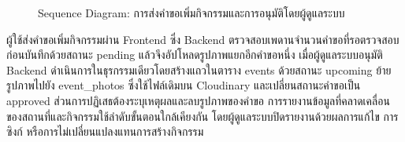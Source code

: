 \begin{figure}[H]
\centering
{}
\caption{Sequence Diagram: การส่งคำขอเพิ่มกิจกรรมและการอนุมัติโดยผู้ดูแลระบบ}
\label{fig:sequence_event_request}
\end{figure}

ผู้ใช้ส่งคำขอเพิ่มกิจกรรมผ่าน Frontend ซึ่ง Backend ตรวจสอบเพดานจำนวนคำขอที่รอตรวจสอบก่อนบันทึกด้วยสถานะ pending แล้วจึงอัปโหลดรูปภาพแยกอีกคำขอหนึ่ง เมื่อผู้ดูแลระบบอนุมัติ Backend ดำเนินการในธุรกรรมเดียวโดยสร้างแถวในตาราง events ด้วยสถานะ upcoming ย้ายรูปภาพไปยัง event\_photos ซึ่งใช้ไฟล์เดิมบน Cloudinary และเปลี่ยนสถานะคำขอเป็น approved ส่วนการปฏิเสธต้องระบุเหตุผลและลบรูปภาพของคำขอ การรายงานข้อมูลที่คลาดเคลื่อนของสถานที่และกิจกรรมใช้ลำดับขั้นตอนใกล้เคียงกัน โดยผู้ดูแลระบบปิดรายงานด้วยผลการแก้ไข การซิงก์ หรือการไม่เปลี่ยนแปลงแทนการสร้างกิจกรรม

